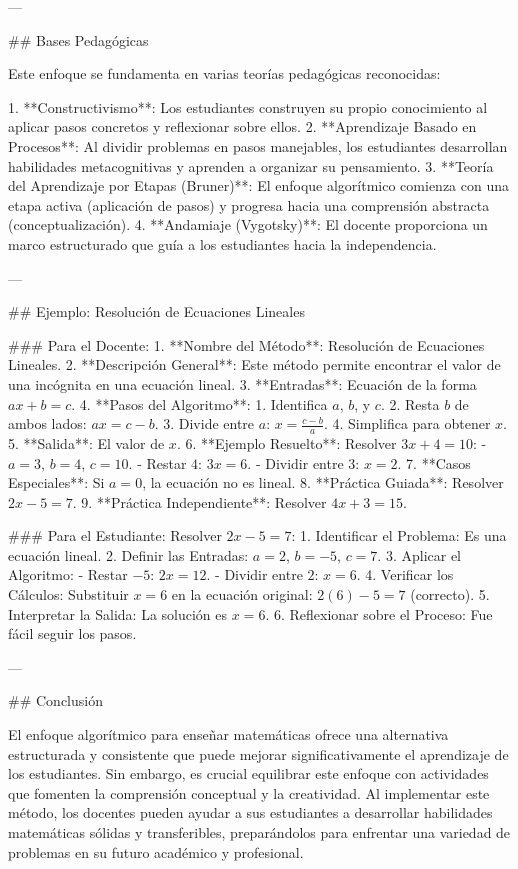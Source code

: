 \documentclass[12pt]{article}
\begin{document}
\begin{markdown}
---

## Bases Pedagógicas

Este enfoque se fundamenta en varias teorías pedagógicas reconocidas:

1. **Constructivismo**: Los estudiantes construyen su propio conocimiento al aplicar pasos concretos y reflexionar sobre ellos.
2. **Aprendizaje Basado en Procesos**: Al dividir problemas en pasos manejables, los estudiantes desarrollan habilidades metacognitivas y aprenden a organizar su pensamiento.
3. **Teoría del Aprendizaje por Etapas (Bruner)**: El enfoque algorítmico comienza con una etapa activa (aplicación de pasos) y progresa hacia una comprensión abstracta (conceptualización).
4. **Andamiaje (Vygotsky)**: El docente proporciona un marco estructurado que guía a los estudiantes hacia la independencia.

---

## Ejemplo: Resolución de Ecuaciones Lineales

### Para el Docente:
1. **Nombre del Método**: Resolución de Ecuaciones Lineales.
2. **Descripción General**: Este método permite encontrar el valor de una incógnita en una ecuación lineal.
3. **Entradas**: Ecuación de la forma $ ax + b = c $.
4. **Pasos del Algoritmo**:
   1. Identifica $ a $, $ b $, y $ c $.  
   2. Resta $ b $ de ambos lados: $ ax = c - b $.  
   3. Divide entre $ a $: $ x = \frac{c - b}{a} $.  
   4. Simplifica para obtener $ x $.  
5. **Salida**: El valor de $ x $.
6. **Ejemplo Resuelto**: Resolver $ 3x + 4 = 10 $:  
   - $ a = 3 $, $ b = 4 $, $ c = 10 $.  
   - Restar $ 4 $: $ 3x = 6 $.  
   - Dividir entre $ 3 $: $ x = 2 $.  
7. **Casos Especiales**: Si $ a = 0 $, la ecuación no es lineal.
8. **Práctica Guiada**: Resolver $ 2x - 5 = 7 $.  
9. **Práctica Independiente**: Resolver $ 4x + 3 = 15 $.

### Para el Estudiante:
Resolver $ 2x - 5 = 7 $:
1. Identificar el Problema: Es una ecuación lineal.
2. Definir las Entradas: $ a = 2 $, $ b = -5 $, $ c = 7 $.
3. Aplicar el Algoritmo:
   - Restar $ -5 $: $ 2x = 12 $.  
   - Dividir entre $ 2 $: $ x = 6 $.  
4. Verificar los Cálculos: Substituir $ x = 6 $ en la ecuación original: $ 2(6) - 5 = 7 $ (correcto).  
5. Interpretar la Salida: La solución es $ x = 6 $.  
6. Reflexionar sobre el Proceso: Fue fácil seguir los pasos.

---

## Conclusión

El enfoque algorítmico para enseñar matemáticas ofrece una alternativa estructurada y consistente que puede mejorar significativamente el aprendizaje de los estudiantes. Sin embargo, es crucial equilibrar este enfoque con actividades que fomenten la comprensión conceptual y la creatividad. Al implementar este método, los docentes pueden ayudar a sus estudiantes a desarrollar habilidades matemáticas sólidas y transferibles, preparándolos para enfrentar una variedad de problemas en su futuro académico y profesional.
\end{markdown}
\end{document}
